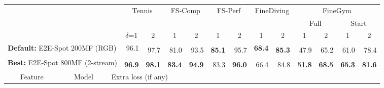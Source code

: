 \documentclass[runningheads]{llncs}
\newcommand{\OURMETHOD}{{E2E-Spot}\xspace}
\newcommand{\fscomp}{{FS-Comp}\xspace}
\newcommand{\fsperf}{{FS-Perf}\xspace}
\newcommand{\tennis}{{Tennis}\xspace}
\newcommand{\finegym}{{FineGym}\xspace}
\newcommand{\finediving}{{FineDiving}\xspace}
\newcommand{\best}[1]{\underline{#1}}
\newcommand{\sota}[1]{\textbf{#1}}
\newcommand{\nms}{\textsuperscript{\textdagger}}
\begin{document}
\renewcommand{\tabcolsep}{0.05cm}
\begin{table*}[p]
    \centering
    \caption{{\bf Spotting performance (mAP @ $\delta$ frames)} using pre-trained features without fine-tuning.
\textdagger~indicates NMS.
The best baseline scores are \best{underlined}.
Due to the low performance of I3D~\cite{i3d} features (compared to TSP~\cite{tsp}), we do not extract I3D features for \finediving and \finegym.
    }
    \label{tab:supp_full_pretrained}
    {
    \tiny
    \begin{tabularx}{\textwidth}{lll
        rr
        rr
        rr
        rr
        rr
        rr
    }
        \toprule
        &&
            & \multicolumn{2}{c}{\tennis}
            & \multicolumn{2}{c}{\fscomp}
            & \multicolumn{2}{c}{\fsperf}
            & \multicolumn{2}{c}{\finediving}
            & \multicolumn{4}{c}{\finegym}
            \\
        &&
            & \multicolumn{2}{c}{}
            & \multicolumn{2}{c}{}
            & \multicolumn{2}{c}{}
            & \multicolumn{2}{c}{}
            & \multicolumn{2}{c}{Full}
            & \multicolumn{2}{c}{Start}
            \\
        &&
            & \multicolumn{1}{c}{$\delta$=1}
            & \multicolumn{1}{c}{2}
            & \multicolumn{1}{c}{1}
            & \multicolumn{1}{c}{2}
            & \multicolumn{1}{c}{1}
            & \multicolumn{1}{c}{2}
            & \multicolumn{1}{c}{1}
            & \multicolumn{1}{c}{2}
            & \multicolumn{1}{c}{1}
            & \multicolumn{1}{c}{2}
            & \multicolumn{1}{c}{1}
            & \multicolumn{1}{c}{2}
            \\
        \midrule

        \multicolumn{3}{l}{{\bf Default:} \OURMETHOD 200MF (RGB)}
            & 96.1 & \nms 97.7
            & \nms 81.0 & \nms 93.5 & \nms \sota{85.1} & \nms 95.7 & \sota{68.4} & \nms \sota{85.3}
            & \nms 47.9 & \nms 65.2
            & \nms 61.0 & \nms 78.4
            \\
        \multicolumn{3}{l}{{\bf Best:} \OURMETHOD 800MF (2-stream)}
            & \nms \sota{96.9} & \nms \sota{98.1}
            & \nms \sota{83.4} & \nms \sota{94.9} & \nms 83.3 & \nms \sota{96.0} & \nms 66.4 & \nms 84.8
            & \nms \sota{51.8} & \nms \sota{68.5}
            & \nms \sota{65.3} & \nms \sota{81.6}
            \\

        \midrule
        \multicolumn{1}{c}{Feature} & \multicolumn{1}{c}{Model} &
            \multicolumn{4}{l}{Extra loss (if any)} \\


\end{tabularx}}
\end{table*}
\end{document}

